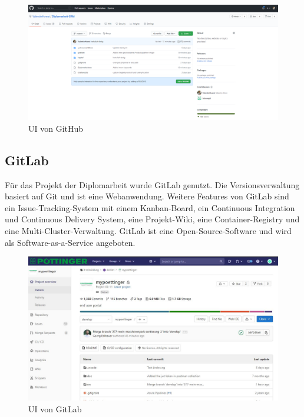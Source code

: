 \begin{figure}[H]
	\centerline{
		\includegraphics[width=1\textwidth, frame]{./grafiken/github_screen.png}
	}
	\vskip0pt
	\caption{UI von GitHub} \label{fig:github}
\end{figure}

\subsection{GitLab}
Für das Projekt der Diplomarbeit wurde GitLab genutzt. Die Versionsverwaltung basiert auf Git und ist eine Webanwendung. Weitere Features von GitLab sind ein Issue-Tracking-System mit einem Kanban-Board, ein Continuous Integration und Continuous Delivery System, eine Projekt-Wiki, eine Container-Registry und eine Multi-Cluster-Verwaltung. GitLab ist eine Open-Source-Software und wird als Software-as-a-Service angeboten. \autocite{wikiGitLab}

\begin{figure}[H]
	\centerline{
		\includegraphics[width=1\textwidth, frame]{./grafiken/gitlab_startseite.JPG}
	}
	\vskip0pt
	\caption{UI von GitLab}
\end{figure}
